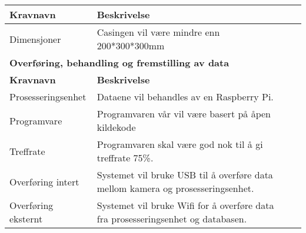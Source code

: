 \begin{table}[!htbp]
{\begin{tabular}{|l|l|l|}
\textbf{Kravnavn} & \textbf{Beskrivelse} & \textbf{} \\ \hline
Dimensjoner & Casingen vil være mindre enn 200*300*300mm &  \\ \hline
\multicolumn{3}{|l|}{\textbf{Overføring, behandling og fremstilling av data}} \\ \hline
\textbf{Kravnavn} & \textbf{Beskrivelse} & \textbf{} \\ \hline
Prosesseringsenhet & Dataene vil behandles av en Raspberry Pi. &  \\ \hline
Programvare & Programvaren vår vil være basert på åpen kildekode &  \\ \hline
Treffrate & Programvaren skal være god nok til å gi treffrate 75\%. &  \\ \hline
Overføring intert & Systemet vil bruke USB til å overføre data mellom kamera og prosesseringsenhet. &  \\ \hline
Overføring eksternt & Systemet vil bruke Wifi for å overføre data fra prosesseringsenhet og databasen. &  \\ \hline
\end{tabular}%
}
\end{table}
